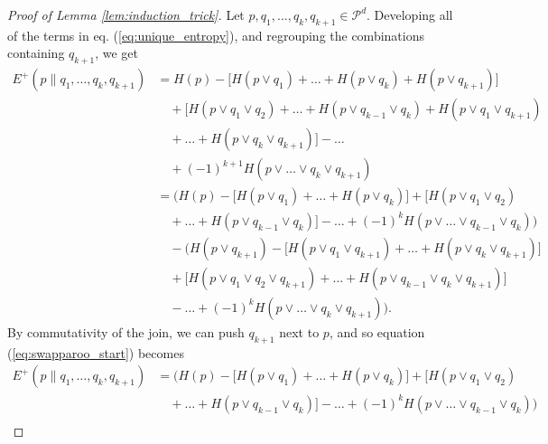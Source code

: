 \begin{proof}[Proof of Lemma \ref{lem:induction_trick}]
    Let $p, q_1, \dots, q_k, q_{k+1} \in \mathcal{P}^d$. Developing all of the terms in eq. (\ref{eq:unique_entropy}), and regrouping the combinations containing $q_{k+1}$, we get
    \begin{align}
        E^+(p \parallel q_1, \dots, q_k, q_{k+1}) &= H(p) - \Big[H(p \vee q_1) + \dots + H(p \vee q_k) + H(p \vee q_{k+1})\Big] \nonumber \\
                                                  &\quad + \Big[H(p \vee q_1 \vee q_2) + \dots + H(p \vee q_{k-1} \vee q_k) + H(p \vee q_1 \vee q_{k+1}) \nonumber \\
                                                  &\quad + \dots + H(p \vee q_k \vee q_{k+1})\Big] - \dots\nonumber \\
                                                  &\quad + (-1)^{k+1} H(p \vee \dots \vee q_k \vee q_{k+1})\\
                                                  &= \Big(H(p) - \big[H(p \vee q_1) + \dots + H(p \vee q_k)\big] + \big[H(p \vee q_1 \vee q_2)\nonumber \\
                                                  &\quad + \dots + H(p \vee q_{k-1} \vee q_k)\big] - \dots + (-1)^{k} H(p \vee \dots \vee q_{k-1} \vee q_{k})\Big) \nonumber \\
                                                  &\quad - \Big(H(p \vee q_{k+1}) - \big[H(p \vee q_1 \vee q_{k+1}) + \dots + H(p \vee q_k \vee q_{k+1})\big]\nonumber \\
                                                  &\quad + \big[H(p \vee q_1 \vee q_2 \vee q_{k+1}) + \dots + H(p \vee q_{k-1} \vee q_k \vee q_{k+1})\big]\nonumber \\
                                                  &\quad - \dots + (-1)^{k} H(p \vee \dots \vee q_k \vee q_{k+1})\Big). \label{eq:swapparoo_start}
    \end{align}
    By commutativity of the join, we can push $q_{k+1}$ next to $p$, and so equation (\ref{eq:swapparoo_start}) becomes
    \begin{align}
        E^+(p \parallel q_1, \dots, q_k, q_{k+1}) &= \Big(H(p) - \big[H(p \vee q_1) + \dots + H(p \vee q_k)\big] + \big[H(p \vee q_1 \vee q_2)\nonumber \\
                                                  &\quad + \dots + H(p \vee q_{k-1} \vee q_k)\big] - \dots + (-1)^{k} H(p \vee \dots \vee q_{k-1} \vee q_{k})\Big) \nonumber \\

\end{align}
\end{proof}
